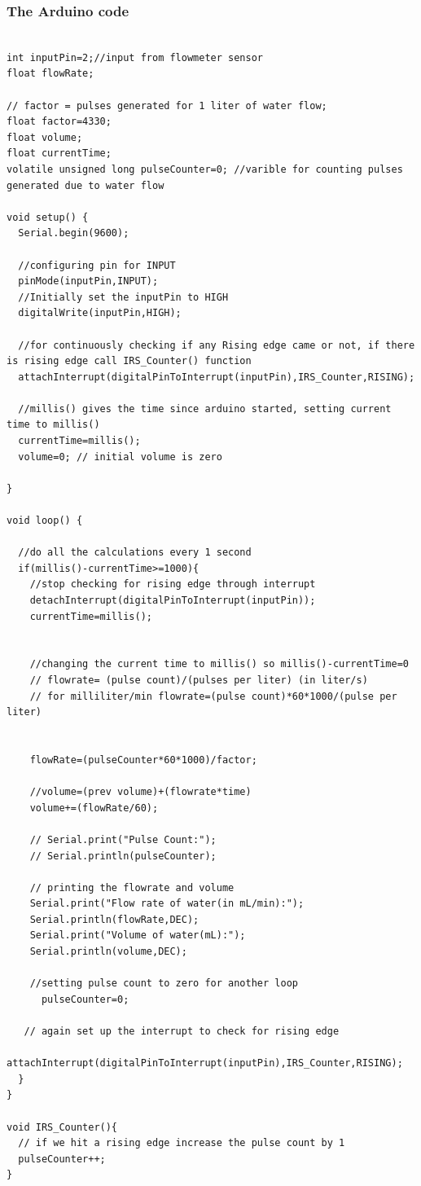 \documentclass[12pt]{article}
\begin{document}
\subsubsection*{The Arduino code}
\begin{lstlisting}[style=Cstyle]

int inputPin=2;//input from flowmeter sensor
float flowRate;

// factor = pulses generated for 1 liter of water flow;
float factor=4330;
float volume;
float currentTime;
volatile unsigned long pulseCounter=0; //varible for counting pulses generated due to water flow

void setup() {
  Serial.begin(9600);

  //configuring pin for INPUT
  pinMode(inputPin,INPUT);
  //Initially set the inputPin to HIGH 
  digitalWrite(inputPin,HIGH);

  //for continuously checking if any Rising edge came or not, if there is rising edge call IRS_Counter() function
  attachInterrupt(digitalPinToInterrupt(inputPin),IRS_Counter,RISING);

  //millis() gives the time since arduino started, setting current time to millis()
  currentTime=millis();
  volume=0; // initial volume is zero
 
}

void loop() {

  //do all the calculations every 1 second
  if(millis()-currentTime>=1000){
    //stop checking for rising edge through interrupt
    detachInterrupt(digitalPinToInterrupt(inputPin));
    currentTime=millis(); 
    
    
    //changing the current time to millis() so millis()-currentTime=0
    // flowrate= (pulse count)/(pulses per liter) (in liter/s)
    // for milliliter/min flowrate=(pulse count)*60*1000/(pulse per liter)
    
    
    flowRate=(pulseCounter*60*1000)/factor;

    //volume=(prev volume)+(flowrate*time)
    volume+=(flowRate/60);
    
    // Serial.print("Pulse Count:");
    // Serial.println(pulseCounter);

    // printing the flowrate and volume
    Serial.print("Flow rate of water(in mL/min):");
    Serial.println(flowRate,DEC);
    Serial.print("Volume of water(mL):");
    Serial.println(volume,DEC);

    //setting pulse count to zero for another loop
      pulseCounter=0;

   // again set up the interrupt to check for rising edge
   attachInterrupt(digitalPinToInterrupt(inputPin),IRS_Counter,RISING);
  }
}

void IRS_Counter(){
  // if we hit a rising edge increase the pulse count by 1
  pulseCounter++;
}
\end{lstlisting}
\end{document}
